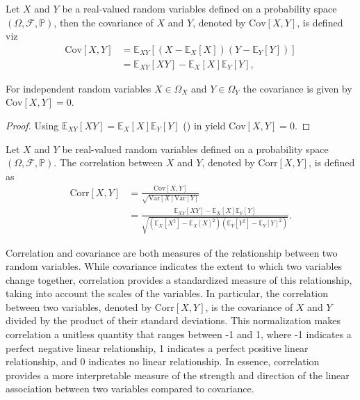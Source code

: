 \begin{definition}[Covariance]
	\label{def:covariance}
	Let $X$ and $Y$ be a real-valued random variables defined on a probability space $(\Omega, \mathcal{F},\mathbb{P})$, then the covariance of $X$ and $Y$, denoted by $\text{Cov}[X,Y]$, is defined viz
	\begin{equation}
		\begin{split}
			\text{Cov}[X,Y]&=\mathbb{E}_{XY}[(X-\mathbb{E}_X[X])(Y-\mathbb{E}_Y[Y])]\\
			&=\mathbb{E}_{XY}[XY]-\mathbb{E}_X[X]\mathbb{E}_Y[Y],
		\end{split}
	\end{equation}
\end{definition}
\begin{theorem}
	\label{theorem:covariance_of_independent_variables}
	For independent random variables $X\in \Omega_X$ and $Y\in \Omega_Y$ the covariance is given by $\text{Cov}[X,Y]=0$.
\end{theorem}
\begin{proof}
	Using $\mathbb{E}_{XY}[XY]=\mathbb{E}_X[X]\mathbb{E}_Y[Y]$ () in  yield $\text{Cov}[X,Y]=0$.
\end{proof}


\begin{definition}[Correlation]
	Let $X$ and $Y$ be real-valued random variables defined on a probability space $(\Omega, \mathcal{F},\mathbb{P})$. The correlation between $X$ and $Y$, denoted by $\text{Corr}[X,Y]$, is defined as
	\begin{equation}
		\begin{split}
			\text{Corr}[X,Y] &= \frac{\text{Cov}[X,Y]}{\sqrt{\text{Var}[X]  \text{Var}[Y]}} \\
			&= \frac{\mathbb{E}_{XY}[XY]-\mathbb{E}_X[X]\mathbb{E}_Y[Y]}{\sqrt{\left(\mathbb{E}_X[X^2] - \mathbb{E}_X[X]^2\right) \left(\mathbb{E}_Y[Y^2] - \mathbb{E}_Y[Y]^2\right)}}.
		\end{split}
	\end{equation}
\end{definition}

Correlation and covariance are both measures of the relationship between two random variables. While covariance indicates the extent to which two variables change together, correlation provides a standardized measure of this relationship, taking into account the scales of the variables. In particular, the correlation between two variables, denoted by $\text{Corr}[X, Y]$, is the covariance of $X$ and $Y$ divided by the product of their standard deviations. This normalization makes correlation a unitless quantity that ranges between -1 and 1, where -1 indicates a perfect negative linear relationship, 1 indicates a perfect positive linear relationship, and 0 indicates no linear relationship. In essence, correlation provides a more interpretable measure of the strength and direction of the linear association between two variables compared to covariance.

